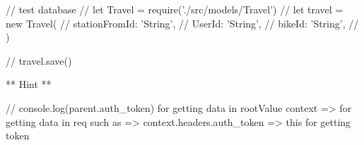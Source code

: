 // test database
// let Travel = require('./src/models/Travel')
// let travel = new Travel({
//   stationFromId: 'String',
//   UserId: 'String',
//   bikeId: 'String',
// })

// travel.save()



** Hint **

    // console.log(parent.auth_token) for getting data in rootValue
    context => for getting data in req 
    such as => context.headers.auth_token => this for getting token